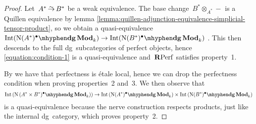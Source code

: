 \begin{refsection}
\begin{theorem}
\begin{proof}[Proof]
    Let~$A^*\weq B^*$ be a weak equivalence. The base change~$B^*\otimes_{A^*}-$ is a Quillen equivalence by lemma \ref{lemma:quillen-adjunction-equivalence-simplicial-tensor-product}, so we obtain a quasi-equivalence~$\Int(\dgMod{\nerve(A^*)^\bullet}_k)\to\Int(\dgMod{\nerve(B^*)^\bullet}_k)$ \cite[proposition 3.2]{toen}. This then descends to the full dg~subcategories of perfect objects, hence \eqref{equation:condition-1} is a quasi-equivalence and~$\mathbf{R}\mathrm{Perf}$ satisfies property~1.

    By \cite[corollary 1.3.7.4]{hagII} we have that perfectness is \'etale local, hence we can drop the perfectness condition when proving properties~2 and~3. We then observe that
    \begin{equation}
      \Int\left( \dgMod{\nerve\left( A^*\times B^*)^\bullet}_k \right) \right)\to\Int\left( \dgMod{\nerve(A^*)^\bullet}_k \right)\times\Int\left( \dgMod{\nerve(B^*)^\bullet}_k \right)
    \end{equation}
    is a quasi-equivalence because the nerve construction respects products, just like the internal dg~category, which proves property~2.


\end{proof}
\end{theorem}
\end{refsection}
